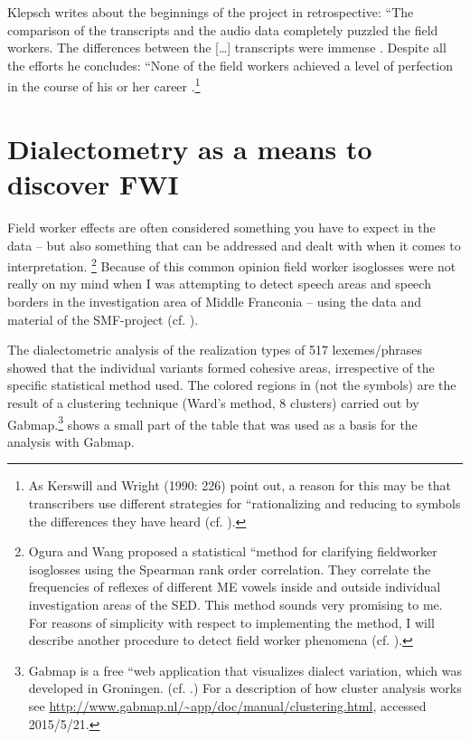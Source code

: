 \documentclass[output=paper]{LSP/langsci}
\begin{document}
Klepsch writes about the beginnings of the project in retrospective: ``The comparison of the transcripts and the audio data completely puzzled the field workers. The differences between the […] transcripts were immense{\textquotedbl} \citep[25]{klepsch_wie_2013}. Despite all the efforts he concludes: ``None of the field workers achieved a level of perfection in the course of his or her career{\textquotedbl} \citep[27]{klepsch_wie_2013}.\footnote{As Kerswill and Wright (1990: 226) point out, a reason for this may be that transcribers use different strategies for ``rationalizing and reducing to symbols the differences they have heard{\textquotedbl} (cf. \citealt[269]{kerswill_limits_1990}).}

\section{Dialectometry as a means to discover FWI}
Field worker effects are often considered something you have to expect in the data – but also something that can be addressed and dealt with when it comes to interpretation.%
\footnote{Ogura and Wang proposed a statistical ``method for clarifying fieldworker isoglosses{\textquotedbl} using the Spearman rank order correlation. They correlate the frequencies of reflexes of different ME vowels inside and outside individual investigation areas of the SED. This method sounds very promising to me. For reasons of simplicity with respect to implementing the method, I will describe another procedure to detect field worker phenomena (cf. \citealt{ogura_isoglosses_1992}).}
Because of this common opinion field worker isoglosses were not really on my mind when I was attempting to detect speech areas and speech borders in the investigation area of Middle Franconia – using the data and material of the SMF-project (cf. \citealt{mathussek_sprachraume_2014}).

The dialectometric analysis of the realization types of 517 lexemes/phrases showed that the individual variants formed cohesive areas, irrespective of the specific statistical method used. %
The colored regions in  (not the symbols) are the result of a clustering technique (Ward's method, 8 clusters) carried out by Gabmap.\footnote{Gabmap is a free ``web application that visualizes dialect variation{\textquotedbl}, which was developed in Groningen. (cf. \citealt{nerbonne_gabmap_2011}.) For a description of how cluster analysis works see \url{http://www.gabmap.nl/\~app/doc/manual/clustering.html}, accessed 2015/5/21.}  shows a small part of the table that was used as a basis for the analysis with Gabmap.
\end{document}
